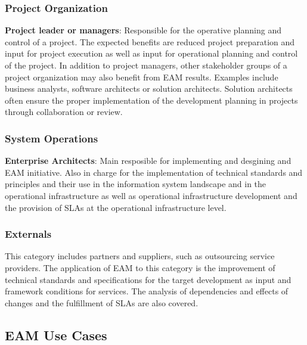 \subsubsection{Project Organization}
\textbf{Project leader or managers}: Responsible for the operative planning and control of a project. The expected benefits are reduced project preparation and input for project execution as well as input for operational planning and control of the project.
In addition to project managers, other stakeholder groups of a project organization may also benefit from EAM results. Examples include business analysts, software architects or solution architects. Solution architects often ensure the proper implementation of the development planning in projects through collaboration or review. 

\subsubsection{System Operations}
\textbf{Enterprise Architects}: Main resposible for implementing and desgining and EAM initiative. Also in charge for the implementation of technical standards and principles and their use in the information system landscape and in the operational infrastructure as well as operational infrastructure development and the provision of SLAs at the operational infrastructure level.


\subsubsection{Externals}
This category includes partners and suppliers, such as outsourcing service providers. The application of EAM to this category is the improvement of technical standards and specifications for the target development as input and framework conditions for services. The analysis of dependencies and effects of changes and the fulfillment of SLAs are also covered.


\subsection{EAM Use Cases}

